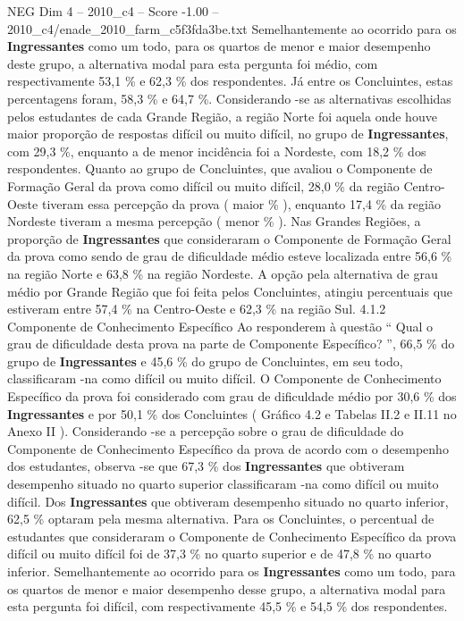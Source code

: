 \begin{textsample}{NEG Dim 4 – 2010\_c4 – Score -1.00 – 2010\_c4/enade\_2010\_farm\_c5f3fda3be.txt}
Semelhantemente ao ocorrido para os \textbf{Ingressantes} como um todo, para os quartos de menor e maior desempenho deste grupo, a alternativa modal para esta pergunta foi médio, com respectivamente 53,1 \% e 62,3 \% dos respondentes.
Já entre os Concluintes, estas percentagens foram, 58,3 \% e 64,7 \%.
Considerando -se as alternativas escolhidas pelos estudantes de cada Grande Região, a região Norte foi aquela onde houve maior proporção de respostas difícil ou muito difícil, no grupo de \textbf{Ingressantes}, com 29,3 \%, enquanto a de menor incidência foi a Nordeste, com 18,2 \% dos respondentes.
Quanto ao grupo de Concluintes, que avaliou o Componente de Formação Geral da prova como difícil ou muito difícil, 28,0 \% da região Centro-Oeste tiveram essa percepção da prova ( maior \% ), enquanto 17,4 \% da região Nordeste tiveram a mesma percepção ( menor \% ).
Nas Grandes Regiões, a proporção de \textbf{Ingressantes} que consideraram o Componente de Formação Geral da prova como sendo de grau de dificuldade médio esteve localizada entre 56,6 \% na região Norte e 63,8 \% na região Nordeste.
A opção pela alternativa de grau médio por Grande Região que foi feita pelos Concluintes, atingiu percentuais que estiveram entre 57,4 \% na Centro-Oeste e 62,3 \% na região Sul. 4.1.2 Componente de Conhecimento Específico Ao responderem à questão “ Qual o grau de dificuldade desta prova na parte de Componente Específico? ”, 66,5 \% do grupo de \textbf{Ingressantes} e 45,6 \% do grupo de Concluintes, em seu todo, classificaram -na como difícil ou muito difícil.
O Componente de Conhecimento Específico da prova foi considerado com grau de dificuldade médio por 30,6 \% dos \textbf{Ingressantes} e por 50,1 \% dos Concluintes ( Gráfico 4.2 e Tabelas II.2 e II.11 no Anexo II ).
Considerando -se a percepção sobre o grau de dificuldade do Componente de Conhecimento Específico da prova de acordo com o desempenho dos estudantes, observa -se que 67,3 \% dos \textbf{Ingressantes} que obtiveram desempenho situado no quarto superior classificaram -na como difícil ou muito difícil.
Dos \textbf{Ingressantes} que obtiveram desempenho situado no quarto inferior, 62,5 \% optaram pela mesma alternativa.
Para os Concluintes, o percentual de estudantes que consideraram o Componente de Conhecimento Específico da prova difícil ou muito difícil foi de 37,3 \% no quarto superior e de 47,8 \% no quarto inferior.
Semelhantemente ao ocorrido para os \textbf{Ingressantes} como um todo, para os quartos de menor e maior desempenho desse grupo, a alternativa modal para esta pergunta foi difícil, com respectivamente 45,5 \% e 54,5 \% dos respondentes.

\end{textsample}
